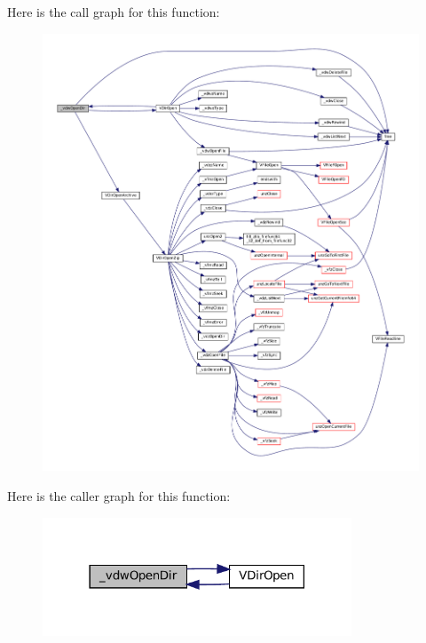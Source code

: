 Here is the call graph for this function\+:
\nopagebreak
\begin{figure}[H]
\begin{center}
\leavevmode
\includegraphics[width=350pt]{vfs-w32_8c_a602c5a9cb86c217774922a5e150e640c_cgraph}
\end{center}
\end{figure}
Here is the caller graph for this function\+:
\nopagebreak
\begin{figure}[H]
\begin{center}
\leavevmode
\includegraphics[width=261pt]{vfs-w32_8c_a602c5a9cb86c217774922a5e150e640c_icgraph}
\end{center}
\end{figure}
\mbox{\label{vfs-w32_8c_a748986f90f041704959b73a453216e4f}} 
